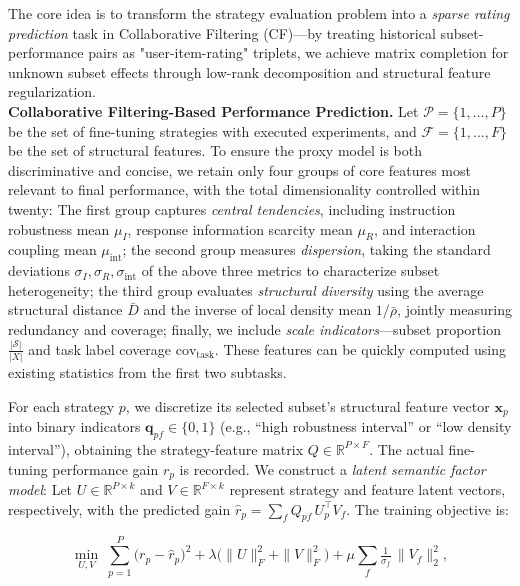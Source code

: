 \documentclass[12pt,a4paper]{article}
\begin{document}
The core idea is to transform the strategy evaluation problem into a \emph{sparse rating prediction} task in Collaborative Filtering (CF)—by treating historical subset-performance pairs as "user-item-rating" triplets, we achieve matrix completion for unknown subset effects through low-rank decomposition and structural feature regularization.\\
\textbf{Collaborative Filtering-Based Performance Prediction.}
Let $\mathcal{P}=\{1,\dots,P\}$ be the set of fine-tuning strategies with executed experiments, and $\mathcal{F}=\{1,\dots,F\}$ be the set of structural features. To ensure the proxy model is both discriminative and concise, we retain only four groups of core features most relevant to final performance, with the total dimensionality controlled within twenty: The first group captures \emph{central tendencies}, including instruction robustness mean $\mu_I$, response information scarcity mean $\mu_R$, and interaction coupling mean $\mu_{\text{int}}$; the second group measures \emph{dispersion}, taking the standard deviations $\sigma_I,\sigma_R,\sigma_{\text{int}}$ of the above three metrics to characterize subset heterogeneity; the third group evaluates \emph{structural diversity} using the average structural distance $\bar{D}$ and the inverse of local density mean $1/\bar{\rho}$, jointly measuring redundancy and coverage; finally, we include \emph{scale indicators}—subset proportion $\frac{|\mathcal S|}{|X|}$ and task label coverage $\text{cov}_{\text{task}}$. These features can be quickly computed using existing statistics from the first two subtasks.

For each strategy $p$, we discretize its selected subset's structural feature vector $\mathbf{x}_p$ into binary indicators $\mathbf{q}_{pf}\in\{0,1\}$ (e.g., ``high robustness interval'' or ``low density interval''), obtaining the strategy-feature matrix $Q\in\mathbb{R}^{P\times F}$. The actual fine-tuning performance gain $r_p$ is recorded. We construct a \emph{latent semantic factor model}: Let $U\in\mathbb{R}^{P\times k}$ and $V\in\mathbb{R}^{F\times k}$ represent strategy and feature latent vectors, respectively, with the predicted gain $\hat{r}_p=\sum_{f} Q_{pf}\, U_p^\top V_f$. The training objective is:

\vspace{-1em}
\begin{equation}
\min_{U,V}\;\sum_{p=1}^{P}\bigl(r_p-\hat{r}_p\bigr)^2
      +\lambda\bigl(\|U\|_F^2+\|V\|_F^2\bigr)
      +\mu\sum_{f}\!\tfrac{1}{\sigma_f}\,\|V_f\|_2^2,
\end{equation}
\vspace{-1em}
\end{document}
